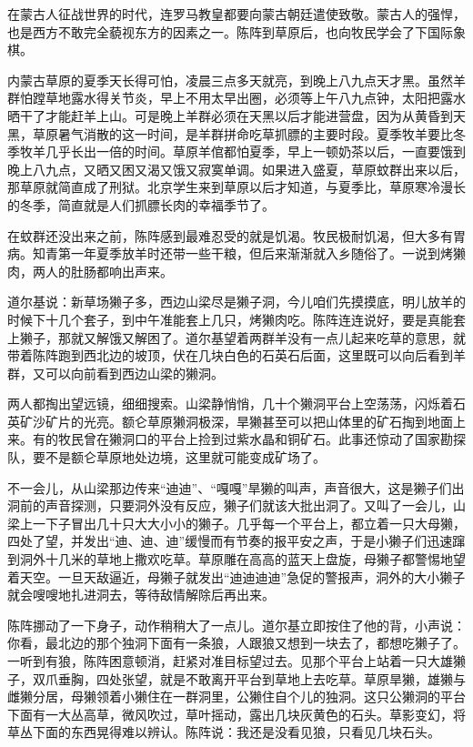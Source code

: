 \par 在蒙古人征战世界的时代，连罗马教皇都要向蒙古朝廷遣使致敬。蒙古人的强悍，也是西方不敢完全藐视东方的因素之一。陈阵到草原后，也向牧民学会了下国际象棋。
\par 内蒙古草原的夏季天长得可怕，凌晨三点多天就亮，到晚上八九点天才黑。虽然羊群怕蹚草地露水得关节炎，早上不用太早出圈，必须等上午八九点钟，太阳把露水晒干了才能赶羊上山。可是晚上羊群必须在天黑以后才能进营盘，因为从黄昏到天黑，草原暑气消散的这一时间，是羊群拼命吃草抓膘的主要时段。夏季牧羊要比冬季牧羊几乎长出一倍的时间。草原羊倌都怕夏季，早上一顿奶茶以后，一直要饿到晚上八九点，又晒又困又渴又饿又寂寞单调。如果进入盛夏，草原蚊群出来以后，那草原就简直成了刑狱。北京学生来到草原以后才知道，与夏季比，草原寒冷漫长的冬季，简直就是人们抓膘长肉的幸福季节了。
\par 在蚊群还没出来之前，陈阵感到最难忍受的就是饥渴。牧民极耐饥渴，但大多有胃病。知青第一年夏季放羊时还带一些干粮，但后来渐渐就入乡随俗了。一说到烤獭肉，两人的肚肠都响出声来。
\par 道尔基说：新草场獭子多，西边山梁尽是獭子洞，今儿咱们先摸摸底，明儿放羊的时候下十几个套子，到中午准能套上几只，烤獭肉吃。陈阵连连说好，要是真能套上獭子，那就又解饿又解困了。道尔基望着两群羊没有一点儿起来吃草的意思，就带着陈阵跑到西北边的坡顶，伏在几块白色的石英石后面，这里既可以向后看到羊群，又可以向前看到西边山梁的獭洞。
\par 两人都掏出望远镜，细细搜索。山梁静悄悄，几十个獭洞平台上空荡荡，闪烁着石英矿沙矿片的光亮。额仑草原獭洞极深，旱獭甚至可以把山体里的矿石掏到地面上来。有的牧民曾在獭洞口的平台上捡到过紫水晶和铜矿石。此事还惊动了国家勘探队，要不是额仑草原地处边境，这里就可能变成矿场了。
\par 不一会儿，从山梁那边传来“迪迪”、“嘎嘎”旱獭的叫声，声音很大，这是獭子们出洞前的声音探测，只要洞外没有反应，獭子们就该大批出洞了。又叫了一会儿，山梁上一下子冒出几十只大大小小的獭子。几乎每一个平台上，都立着一只大母獭，四处了望，并发出“迪、迪、迪”缓慢而有节奏的报平安之声，于是小獭子们迅速蹿到洞外十几米的草地上撒欢吃草。草原雕在高高的蓝天上盘旋，母獭子都警惕地望着天空。一旦天敌逼近，母獭子就发出“迪迪迪迪”急促的警报声，洞外的大小獭子就会嗖嗖地扎进洞去，等待敌情解除后再出来。
\par 陈阵挪动了一下身子，动作稍稍大了一点儿。道尔基立即按住了他的背，小声说：你看，最北边的那个独洞下面有一条狼，人跟狼又想到一块去了，都想吃獭子了。一听到有狼，陈阵困意顿消，赶紧对准目标望过去。见那个平台上站着一只大雄獭子，双爪垂胸，四处张望，就是不敢离开平台到草地上去吃草。草原旱獭，雄獭与雌獭分居，母獭领着小獭住在一群洞里，公獭住自个儿的独洞。这只公獭洞的平台下面有一大丛高草，微风吹过，草叶摇动，露出几块灰黄色的石头。草影变幻，将草丛下面的东西晃得难以辨认。陈阵说：我还是没看见狼，只看见几块石头。
